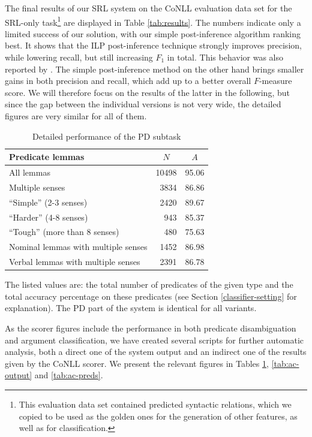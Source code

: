 \documentclass[12pt,notitlepage]{report}
\begin{document}
The final results of our SRL system on the CoNLL evaluation data set for the SRL-only task\footnote{This evaluation data set contained predicted syntactic relations, which we copied to be used as the golden ones for the generation of other features, as well as for classification.} are displayed in Table \ref{tab:results}. The numbers indicate only a limited success of our solution, with our simple post-inference algorithm ranking best. It shows that the ILP post-inference technique strongly improves precision, while lowering recall, but still increasing $F_1$ in total. This behavior was also reported by \citet{che09}. The simple post-inference method on the other hand brings smaller gains in both precision and recall, which add up to a better overall $F$\mbox{-}measure score. We will therefore focus on the results of the latter in the following, but since the gap between the individual versions is not very wide, the detailed figures are very similar for all of them.

\begin{table}[htb]\footnotesize
\caption{Detailed performance of the PD subtask}\label{tab:pd-output}
\begin{center}
\begin{tabular}{|l|r|c|}\hline
\bf Predicate lemmas & \multicolumn{1}{c|}{$N$} & $A$ \\\hline
All lemmas & 10498 & 95.06 \\
Multiple senses & 3834 & 86.86 \\
``Simple'' (2-3 senses) & 2420 & 89.67 \\
``Harder'' (4-8 senses) & 943 & 85.37 \\
``Tough'' (more than 8 senses) & 480 & 75.63 \\\hline 
Nominal lemmas with multiple senses & 1452 & 86.98 \\
Verbal lemmas with multiple senses & 2391 & 86.78 \\\hline
\end{tabular}
\end{center}
The listed values are: the total number of predicates of the given type and the total accuracy percentage on these predicates (see Section \ref{classifier-setting} for explanation). The PD part of the system is identical for all variants.
\end{table}

As the scorer figures include the performance in both predicate disambiguation and argument classification, we have created several scripts for further automatic analysis, both a direct one of the system output and an indirect one of the results given by the CoNLL scorer. We present the relevant figures in Tables \ref{tab:pd-output}, \ref{tab:ac-output} and \ref{tab:ac-preds}.
\end{document}
